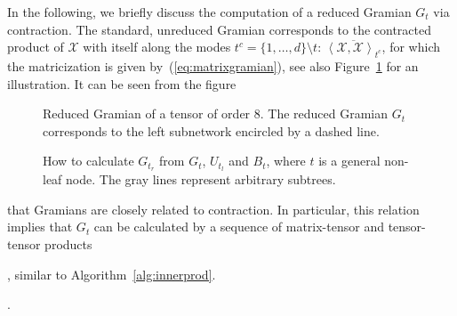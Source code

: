 \documentclass[11pt, a4paper]{article}
\newcommand{\calC}{\mathcal{C}}
\newcommand{\calX}{\mathcal{X}}
\newcommand{\innerprod}[2]{{\left\langle#1,#2\right\rangle}}
\begin{document}
In the following, we briefly discuss the computation of a reduced Gramian $G_t$ via contraction. The
standard, unreduced Gramian corresponds to the contracted product of $\calX$ with itself along
the modes $t^c = \{1,\ldots,d\}\setminus t$: $\overline{\innerprod{\calX}{\calX}_{t^c}}$,
for which the matricization is given by~(\ref{eq:matrixgramian}), see also Figure~\ref{fig:gramian_8} for an illustration.
It can be seen from the figure
\begin{figure}
  \begin{center}
    \resizebox{5cm}{!}{}
  \end{center}
  \caption{Reduced Gramian of a tensor of order $8$. The reduced
    Gramian $G_t$ corresponds to the left subnetwork encircled by a dashed line.}
  \label{fig:gramian_8}
\end{figure}%
%
%
\begin{figure}
  \begin{center}
    \resizebox{12cm}{!}{}
  \end{center}
  \caption{How to calculate $G_{t_r}$ from $G_t$, $U_{t_l}$ and $B_t$,
    where $t$ is a general non-leaf node. The gray lines represent
    arbitrary subtrees.}
  \label{fig:gramian_recursion}
\end{figure}
%
that Gramians are closely related to contraction. In particular, this relation implies that $G_t$ can be calculated by a sequence of matrix-tensor and
tensor-tensor products%
\begin{preprint}
, similar to Algorithm~\ref{alg:innerprod}.
\end{preprint}
\begin{submitted}
.
\end{submitted}
\end{document}
